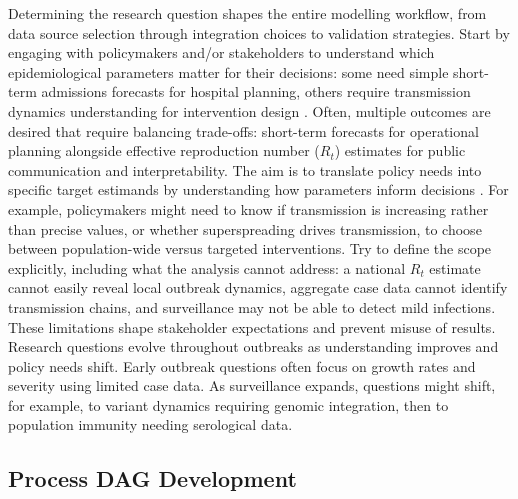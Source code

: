 \documentclass{article}
\begin{document}
Determining the research question shapes the entire modelling workflow, from data source selection through integration choices to validation strategies.
Start by engaging with policymakers and/or stakeholders to understand which epidemiological parameters matter for their decisions: some need simple short-term admissions forecasts for hospital planning, others require transmission dynamics understanding for intervention design \citep{marshall2024when}.
Often, multiple outcomes are desired that require balancing trade-offs: short-term forecasts for operational planning alongside effective reproduction number ($R_t$) estimates for public communication and interpretability.
The aim is to translate policy needs into specific target estimands by understanding how parameters inform decisions \citep{nicholson2022interoperability, gip-2024-ru}.
For example, policymakers might need to know if transmission is increasing rather than precise values, or whether superspreading drives transmission, to choose between population-wide versus targeted interventions.
Try to define the scope explicitly, including what the analysis cannot address: a national $R_t$ estimate cannot easily reveal local outbreak dynamics, aggregate case data cannot identify transmission chains, and surveillance may not be able to detect mild infections.
These limitations shape stakeholder expectations and prevent misuse of results.
Research questions evolve throughout outbreaks as understanding improves and policy needs shift.
Early outbreak questions often focus on growth rates and severity using limited case data.
As surveillance expands, questions might shift, for example, to variant dynamics requiring genomic integration, then to population immunity needing serological data.

\subsection{Process DAG Development} \label{sec:process}
\end{document}
